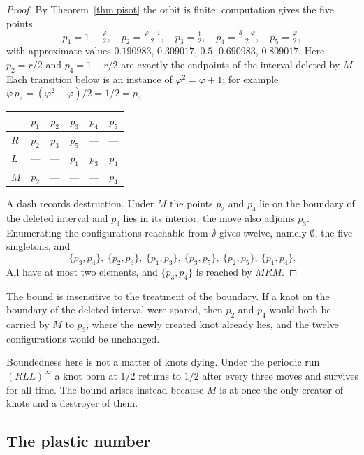 \documentclass[11pt,reqno]{amsart}
\theoremstyle{plain}
\theoremstyle{definition}
\theoremstyle{remark}
\begin{document}
\begin{proof}
By Theorem~\ref{thm:pisot} the orbit is finite; computation gives the five
points
\[
  p_1=1-\tfrac{\varphi}{2},\quad
  p_2=\tfrac{\varphi-1}{2},\quad
  p_3=\tfrac12,\quad
  p_4=\tfrac{3-\varphi}{2},\quad
  p_5=\tfrac{\varphi}{2},
\]
with approximate values $0.190983$, $0.309017$, $0.5$, $0.690983$, $0.809017$.
Here $p_2=r/2$ and $p_4=1-r/2$ are exactly the endpoints of the interval deleted
by $M$. Each transition below is an instance of $\varphi^2=\varphi+1$; for
example $\varphi\,p_2=(\varphi^2-\varphi)/2=1/2=p_3$.

\begin{center}
\begin{tabular}{lccccc}
\toprule
 & $p_1$ & $p_2$ & $p_3$ & $p_4$ & $p_5$\\
\midrule
$R$ & $p_2$ & $p_3$ & $p_5$ & --- & ---\\
$L$ & --- & --- & $p_1$ & $p_3$ & $p_4$\\
$M$ & $p_2$ & --- & --- & --- & $p_4$\\
\bottomrule
\end{tabular}
\end{center}

A dash records destruction. Under $M$ the points $p_2$ and $p_4$ lie on the
boundary of the deleted interval and $p_3$ lies in its interior; the move also
adjoins $p_3$. Enumerating the configurations reachable from $\emptyset$ gives
twelve, namely $\emptyset$, the five singletons, and
\[
  \{p_3,p_4\},\ \{p_2,p_3\},\ \{p_1,p_3\},\ \{p_3,p_5\},\ \{p_2,p_5\},\
  \{p_1,p_4\}.
\]
All have at most two elements, and $\{p_3,p_4\}$ is reached by $MRM$.
\end{proof}

The bound is insensitive to the treatment of the boundary. If a knot on the
boundary of the deleted interval were spared, then $p_2$ and $p_4$ would both be
carried by $M$ to $p_3$, where the newly created knot already lies, and the
twelve configurations would be unchanged.

Boundedness here is not a matter of knots dying. Under the periodic run
$(RLL)^\infty$ a knot born at $1/2$ returns to $1/2$ after every three moves and
survives for all time. The bound arises instead because $M$ is at once the only
creator of knots and a destroyer of them.

\subsection{The plastic number}
\end{document}
